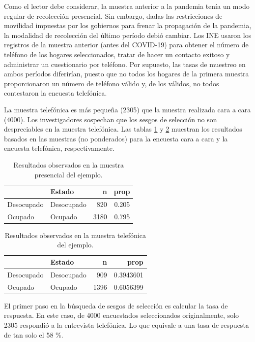 \documentclass[
  12pt,
]{book}
\begin{document}
Como el lector debe considerar, la muestra anterior a la pandemia tenía un modo regular de recolección presencial. Sin embargo, dadas las restricciones de movilidad impuestas por los gobiernos para frenar la propagación de la pandemia, la modalidad de recolección del último período debió cambiar. Los INE usaron los registros de la muestra anterior (antes del COVID-19) para obtener el número de teléfono de los hogares seleccionados, tratar de hacer un contacto exitoso y administrar un cuestionario por teléfono. Por supuesto, las tasas de muestreo en ambos períodos diferirían, puesto que no todos los hogares de la primera muestra proporcionaron un número de teléfono válido y, de los válidos, no todos contestaron la encuesta telefónica.

La muestra telefónica es más pequeña (2305) que la muestra realizada cara a cara (4000). Los investigadores sospechan que los sesgos de selección no son despreciables en la muestra telefónica. Las tablas \ref{tab:tabsesgo5} y \ref{tab:tabsesgo6} muestran los resultados basados en las muestras (no ponderados) para la encuesta cara a cara y la encuesta telefónica, respectivamente.

\begin{table}

\caption{\label{tab:tabsesgo5}Resultados observados en la muestra presencial del ejemplo.}
\centering
\begin{tabular}[t]{l|l|r|r}
\hline
  & Estado & n & prop\\
\hline
Desocupado & Desocupado & 820 & 0.205\\
\hline
Ocupado & Ocupado & 3180 & 0.795\\
\hline
\end{tabular}
\end{table}

\begin{table}

\caption{\label{tab:tabsesgo6}Resultados observados en la muestra telefónica del ejemplo.}
\centering
\begin{tabular}[t]{l|l|r|r}
\hline
  & Estado & n & prop\\
\hline
Desocupado & Desocupado & 909 & 0.3943601\\
\hline
Ocupado & Ocupado & 1396 & 0.6056399\\
\hline
\end{tabular}
\end{table}

El primer paso en la búsqueda de sesgos de selección es calcular la tasa de respuesta. En este caso, de 4000 encuestados seleccionados originalmente, solo 2305 respondió a la entrevista telefónica. Lo que equivale a una tasa de respuesta de tan solo el 58 \%.
\end{document}
